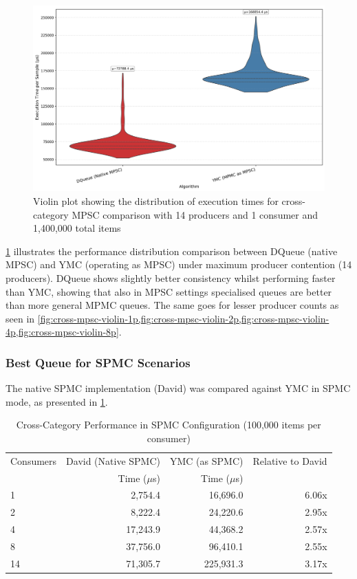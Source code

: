 \begin{figure}[htb]
\centering
\caption{Violin plot showing the distribution of execution times for cross-category MPSC comparison with 14 producers and 1 consumer and 1,400,000 total items}
\label{fig:cross-mpsc-violin-14p}
\includegraphics[width=\textwidth]{images/results/best_in_mpsc_performance_violin_14P1C.png}
\end{figure}

\cref{fig:cross-mpsc-violin-14p} illustrates the performance distribution comparison between DQueue (native MPSC) and \ac{YMC} (operating as MPSC) under maximum producer contention (14 producers). DQueue shows slightly better consistency whilst performing faster than \ac{YMC}, showing that also in \ac{MPSC} settings specialised queues are better than more general \ac{MPMC} queues. The same goes for lesser producer counts as seen in \cref{fig:cross-mpsc-violin-1p,fig:cross-mpsc-violin-2p,fig:cross-mpsc-violin-4p,fig:cross-mpsc-violin-8p}.

\subsubsection{Best Queue for \ac{SPMC} Scenarios}\label{subsubsec:cross-spmc}
The native \ac{SPMC} implementation (David) was compared against \ac{YMC} in \ac{SPMC} mode, as presented in \cref{tab:best-spmc}.

\begin{table}[htb]
\centering
\caption{Cross-Category Performance in \ac{SPMC} Configuration (100,000 items per consumer)}
\label{tab:best-spmc}
\begin{tabular}{@{}lrrr@{}}
\toprule
Consumers & David (Native \ac{SPMC}) & \ac{YMC} (as \ac{SPMC}) & Relative to David \\
& Time ($\mu$s) & Time ($\mu$s) & \\
\midrule
1 & 2,754.4 & 16,696.0 & 6.06x \\
2 & 8,222.4 & 24,220.6 & 2.95x \\
4 & 17,243.9 & 44,368.2 & 2.57x \\
8 & 37,756.0 & 96,410.1 & 2.55x \\
14 & 71,305.7 & 225,931.3 & 3.17x \\
\bottomrule
\end{tabular}
\end{table}

